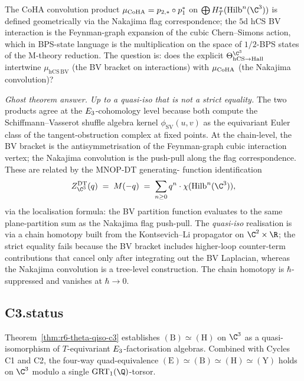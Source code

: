 \begin{remark}[Ghost theorem \#3: convolution product $=$ hCS BPS-state
product or only quasi-iso?]
\label{rem:r6-ghost-theorem-convolution-vs-bps}
The CoHA convolution product $\mu_{\mathrm{CoHA}} = p_{2,*}\circ p_1^*$ on
$\bigoplus H^*_T(\Hilb^n(\C^3))$ is defined geometrically via the
Nakajima flag correspondence; the $5$d hCS BV interaction is the
Feynman-graph expansion of the cubic Chern--Simons action, which in
BPS-state language is the multiplication on the space of $1/2$-BPS
states of the M-theory reduction. The question is: does the explicit
$\Theta^{\C^3}_{\hCS\to\Hall}$ intertwine $\mu_{\mathrm{hCS\,BV}}$
(the BV bracket on interactions) with $\mu_{\mathrm{CoHA}}$ (the Nakajima
convolution)?

\emph{Ghost theorem answer.} \emph{Up to a quasi-iso that is not a
strict equality.} The two products agree at the $E_3$-cohomology
level because both compute the Schiffmann--Vasserot shuffle algebra
kernel $\phi_{\mathrm{SV}}(u,v)$ as the equivariant Euler class of the
tangent-obstruction complex at fixed points. At the chain-level,
the BV bracket is the antisymmetrisation of the Feynman-graph cubic
interaction vertex; the Nakajima convolution is the push-pull along
the flag correspondence. These are related by the MNOP-DT generating-
function identification
\[
Z^{\mathrm{DT}}_{\C^3}(q) \;=\; M(-q)
\;=\; \sum_{n\geq 0}
q^n \cdot \chi(\Hilb^n(\C^3)),
\]
via the localisation formula: the BV partition function evaluates to
the same plane-partition sum as the Nakajima flag push-pull. The
\emph{quasi-iso} realisation is via a chain homotopy built from the
Kontsevich--Li propagator on $\C^2\times\R$; the strict equality fails
because the BV bracket includes higher-loop counter-term contributions
that cancel only after integrating out the BV Laplacian, whereas the
Nakajima convolution is a tree-level construction. The chain homotopy
is $\hbar$-suppressed and vanishes at $\hbar\to 0$.
\end{remark}

\subsection*{C3.status}

Theorem~\ref{thm:r6-theta-qiso-c3} establishes
$(\mathrm B)\simeq(\mathrm H)$ on $\C^3$ as a quasi-isomorphism of
$T$-equivariant $E_3$-factorisation algebras. Combined with Cycles
C1 and C2, the four-way quad-equivalence $(\mathrm E)\simeq(\mathrm
B)\simeq(\mathrm H)\simeq(\mathrm Y)$ holds on $\C^3$ modulo a single
$\GRT_1(\Q)$-torsor.

